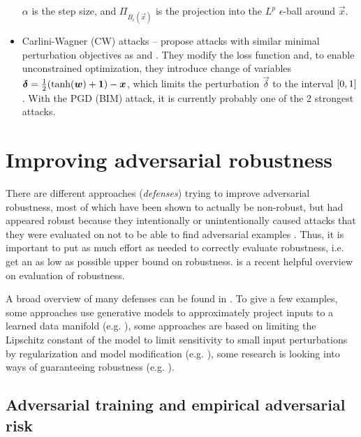 \documentclass[oneside]{book}
\begin{document}
\begin{itemize}
\begin{equation}
	\end{equation}
	$\alpha$ is the step size, and $\Pi_{B_\epsilon(\vec x)}$ is the projection into the $L^p$ $\epsilon$-ball around $\vec x$.
	\item Carlini-Wagner (CW) attacks -- \citet{Carlini:2017:TERNN} propose attacks with similar minimal perturbation objectives as \citet{Szegedy:2013:IPNN} and \citet{Moosavi-Dezfooli:2016:DFSAMFDNN}. They modify the loss function and, to enable unconstrained optimization, they introduce change of variables $\vec\delta=\frac{1}{2}\del{\tanh\del{\vec w} + \cvec 1} - \vec x$, which limits the perturbation $\vec\delta$ to the interval $\intcc{0,1}$. With the PGD (BIM) attack, it is currently probably one of the 2 strongest attacks.
\end{itemize}


\section{Improving adversarial robustness}

There are different approaches (\textit{defenses}) trying to improve adversarial robustness, most of which have been shown to actually be non-robust, but had appeared robust because they intentionally or unintentionally caused attacks that they were evaluated on not to be able to find adversarial examples \citep{Carlini:2017:AEANEDBTM,Athalye:2018:OGGFSS,Uesato:2018:ARDEAWA,Carlini:2017:TERNN}.  Thus, it is important to put as much effort as needed to correctly evaluate robustness, i.e. get an as low as possible upper bound on robustness. \citep{Carlini:2019:OEAR} is a recent helpful overview on evaluation of robustness. 

A broad overview of many defenses can be found in \citet{Serban:2018:AECCP}. To give a few examples, some approaches use generative models to approximately project inputs to a learned data manifold (e.g. \citet{Samangouei:2018:DGPCAAAUGM}), some approaches are based on limiting the Lipschitz constant of the model to limit sensitivity to small input perturbations by regularization and model modification (e.g. \citet{Qian:2018:L2NNN}), some research is looking into ways of guaranteeing robustness (e.g. \citet{Cohen:2019:CARRS}).

\subsection{Adversarial training and empirical adversarial risk}
\end{document}
